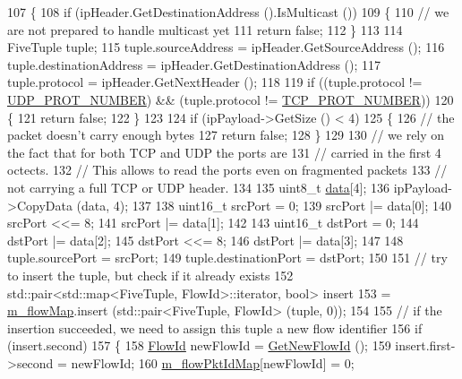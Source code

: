 \begin{DoxyCode}
107 \{
108   \textcolor{keywordflow}{if} (ipHeader.GetDestinationAddress ().IsMulticast ())
109     \{
110       \textcolor{comment}{// we are not prepared to handle multicast yet}
111       \textcolor{keywordflow}{return} \textcolor{keyword}{false};
112     \}
113 
114   FiveTuple tuple;
115   tuple.sourceAddress = ipHeader.GetSourceAddress ();
116   tuple.destinationAddress = ipHeader.GetDestinationAddress ();
117   tuple.protocol = ipHeader.GetNextHeader ();
118 
119   \textcolor{keywordflow}{if} ((tuple.protocol != \hyperlink{namespacens3_ae787098cbb0a3e8f6a17d9249e88a77f}{UDP\_PROT\_NUMBER}) && (tuple.protocol != 
      \hyperlink{namespacens3_a203a34fc0e042720ce1a0a754e270646}{TCP\_PROT\_NUMBER}))
120     \{
121       \textcolor{keywordflow}{return} \textcolor{keyword}{false};
122     \}
123 
124   \textcolor{keywordflow}{if} (ipPayload->GetSize () < 4)
125     \{
126       \textcolor{comment}{// the packet doesn't carry enough bytes}
127       \textcolor{keywordflow}{return} \textcolor{keyword}{false};
128     \}
129 
130   \textcolor{comment}{// we rely on the fact that for both TCP and UDP the ports are}
131   \textcolor{comment}{// carried in the first 4 octects.}
132   \textcolor{comment}{// This allows to read the ports even on fragmented packets}
133   \textcolor{comment}{// not carrying a full TCP or UDP header.}
134 
135   uint8\_t \hyperlink{topology-example-sim_8cc_a26c65296e316af77b787dc77469bb2a4}{data}[4];
136   ipPayload->CopyData (data, 4);
137 
138   uint16\_t srcPort = 0;
139   srcPort |= data[0];
140   srcPort <<= 8;
141   srcPort |= data[1];
142 
143   uint16\_t dstPort = 0;
144   dstPort |= data[2];
145   dstPort <<= 8;
146   dstPort |= data[3];
147 
148   tuple.sourcePort = srcPort;
149   tuple.destinationPort = dstPort;
150 
151   \textcolor{comment}{// try to insert the tuple, but check if it already exists}
152   std::pair<std::map<FiveTuple, FlowId>::iterator, \textcolor{keywordtype}{bool}> insert
153     = \hyperlink{classns3_1_1Ipv6FlowClassifier_a2ba466f42f102ab81aed0d5cffde57a1}{m\_flowMap}.insert (std::pair<FiveTuple, FlowId> (tuple, 0));
154 
155   \textcolor{comment}{// if the insertion succeeded, we need to assign this tuple a new flow identifier}
156   \textcolor{keywordflow}{if} (insert.second)
157     \{
158       \hyperlink{group__flow-monitor_ga39a766c4a370cdb9ab8ac85da4b288e9}{FlowId} newFlowId = \hyperlink{classns3_1_1FlowClassifier_a5469e94282efde8b8212e20995c6cccd}{GetNewFlowId} ();
159       insert.first->second = newFlowId;
160       \hyperlink{classns3_1_1Ipv6FlowClassifier_adfa0df24172af71f377bc0b56456e1ae}{m\_flowPktIdMap}[newFlowId] = 0;

\end{DoxyCode}
